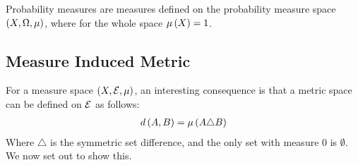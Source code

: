 \begin{example}
  Probability measures are measures
  defined on the probability measure space
  \(\left(X, \Omega, \mu\right)\),
  where for the whole space \(\mu\left(X\right) = 1\).
\end{example}



\subsection{Measure Induced Metric}

For a measure space \(\left(X, \mathcal{E}, \mu\right)\),
an interesting consequence is that a
metric space can be defined on \(\mathcal{E}\)
as follows:
\begin{align*}
  d\left(A, B\right) = \mu\left(A \triangle B\right)
\end{align*}
Where \(\triangle\) is the symmetric set difference,
and the only set with measure \(0\) is \(\emptyset\).
We now set out to show this.


